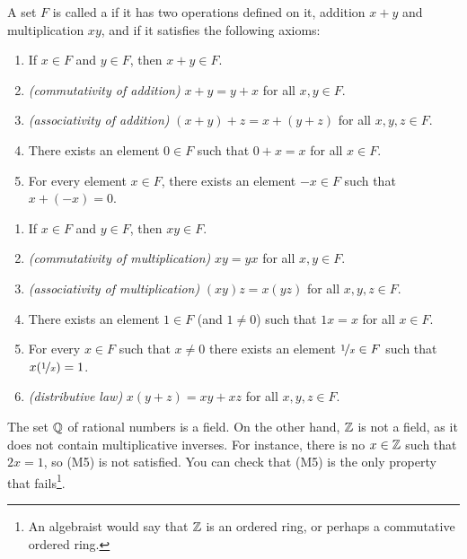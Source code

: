 \begin{defn}
A set $F$ is called a \emph{} if it has two operations
defined on it, addition $x+y$ and multiplication $xy$, and if it satisfies
the following axioms:
\begin{enumerate}[({A}1)]
\item
If $x \in F$ and $y \in F$, then $x+y \in F$.
\item
\emph{(commutativity of addition)}
$x+y = y+x$ for all $x,y \in F$.
\item
\emph{(associativity of addition)}
$(x+y)+z = x+(y+z)$ for all $x,y,z \in F$.
\item
There exists an element $0 \in F$ such that
$0+x = x$ for all $x \in F$.
\item
For every element $x\in F$, there exists an element $-x \in F$
such that $x + (-x) = 0$.
\end{enumerate}
\begin{enumerate}[({M}1)]
\item
If $x \in F$ and $y \in F$, then $xy \in F$.
\item
\emph{(commutativity of multiplication)}
$xy = yx$ for all $x,y \in F$.
\item
\emph{(associativity of multiplication)}
$(xy)z = x(yz)$ for all $x,y,z \in F$.
\item
There exists an element $1 \in F$ (and $1 \neq 0$) such that
$1x = x$ for all $x \in F$.
\item
For every $x\in F$ such that $x \neq 0$ there exists an element
$\nicefrac{1}{x} \in F$
such that $x(\nicefrac{1}{x}) = 1$.
\item[(D)]
\emph{(distributive law)} $x(y+z) = xy+xz$
for all $x,y,z \in F$.
\end{enumerate}
\end{defn}

\begin{example}
The set ${\mathbb{Q}}$ of rational numbers is a field.  On the other hand, ${\mathbb{Z}}$ is not a
field, as it does not contain multiplicative inverses.  For instance,
there is no $x \in {\mathbb{Z}}$ such that $2x = 1$, so (M5) is not satisfied.  You
can check that (M5) is the only property that fails\footnote{An algebraist would say that ${\mathbb{Z}}$ is an ordered
ring, or perhaps a commutative ordered ring.}.
\end{example}

